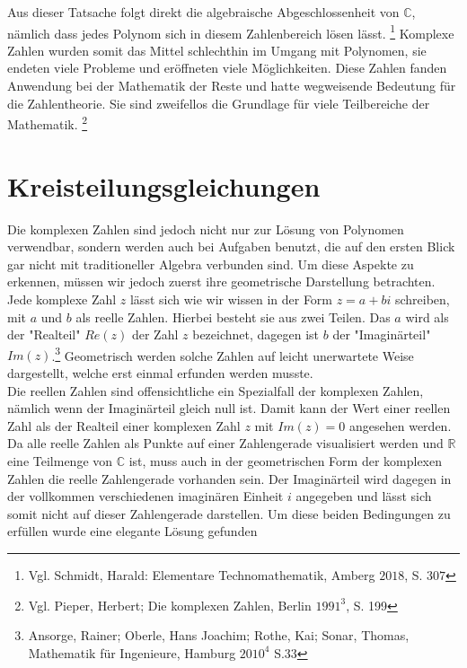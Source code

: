\documentclass[a4paper,12pt]{article} %
\begin{document}
Aus dieser Tatsache folgt direkt die algebraische Abgeschlossenheit von $\mathbb{C}$, nämlich dass jedes Polynom sich in diesem Zahlenbereich lösen lässt.
\footnote{Vgl. Schmidt, Harald: Elementare Technomathematik, Amberg $2018$, S. $307$} 
Komplexe Zahlen wurden somit das Mittel schlechthin im Umgang mit Polynomen, sie endeten viele Probleme und eröffneten viele Möglichkeiten.
Diese Zahlen fanden Anwendung bei der Mathematik der Reste und hatte wegweisende Bedeutung für die Zahlentheorie.
Sie sind zweifellos die Grundlage für viele Teilbereiche der Mathematik. 
\footnote{Vgl. Pieper, Herbert; Die komplexen Zahlen, Berlin $1991^3$, S. 199}


\section{Kreisteilungsgleichungen}

Die komplexen Zahlen sind jedoch nicht nur zur Lösung von Polynomen verwendbar, sondern werden auch bei Aufgaben benutzt, die auf den ersten Blick gar nicht mit traditioneller Algebra verbunden sind.
Um diese Aspekte zu erkennen, müssen wir jedoch zuerst ihre geometrische Darstellung betrachten.\\

Jede komplexe Zahl $z$ lässt sich wie wir wissen in der Form $z=a+bi$ schreiben, mit $a$ und $b$ als reelle Zahlen.
Hierbei besteht sie aus zwei Teilen.
Das $a$ wird als der "Realteil" $Re(z)$ der Zahl $z$ bezeichnet, dagegen ist $b$ der "{Imaginärteil}" $Im(z)$.\footnote{Ansorge, Rainer; Oberle, Hans Joachim; Rothe, Kai; Sonar, Thomas, Mathematik für Ingenieure, Hamburg $2010^4$ S.33}
Geometrisch werden solche Zahlen auf leicht unerwartete Weise dargestellt, welche erst einmal erfunden werden musste.\\

Die reellen Zahlen sind offensichtliche ein Spezialfall der komplexen Zahlen, nämlich wenn der Imaginärteil gleich null ist.
Damit kann der Wert einer reellen Zahl als der Realteil einer komplexen Zahl $z$ mit $Im(z)=0$ angesehen werden.
Da alle reelle Zahlen als Punkte auf einer Zahlengerade visualisiert werden und $\mathbb{R}$ eine Teilmenge von $\mathbb{C}$ ist, muss auch in der geometrischen Form der komplexen Zahlen die reelle Zahlengerade vorhanden sein.
Der Imaginärteil wird dagegen in der vollkommen verschiedenen imaginären Einheit $i$ angegeben und lässt sich somit nicht auf dieser Zahlengerade darstellen.
Um diese beiden Bedingungen zu erfüllen wurde eine elegante Lösung gefunden\\
\end{document}
